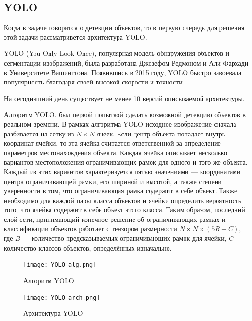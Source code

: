 \documentclass[../document.tex]{subfiles}
\begin{document}
    \subsection{YOLO}
	    \par Когда в задаче говорится о детекции объектов, то в первую очередь для решения этой задачи рассматривется архитектура YOLO.
	    \par YOLO (You Only Look Once), популярная модель обнаружения объектов и сегментации изображений, была разработана Джозефом Редмоном и Али Фархади в Университете Вашингтона. Появившись в 2015 году, YOLO быстро завоевала популярность благодаря своей высокой скорости и точности.
	    \par На сегодняшний день существует не менее 10 версий описываемой архитектуры.
	    \par Алгоритм YOLO, был первой попыткой сделать возможной детекцию объектов в реальном времени. В рамках алгоритма YOLO исходное изображение сначала разбивается на сетку из $N×N$ ячеек. Если центр объекта попадает внутрь координат ячейки, то эта ячейка считается ответственной за определение параметров местонахождения объекта. Каждая ячейка описывает несколько вариантов местоположения ограничивающих рамок для одного и того же объекта. Каждый из этих вариантов характеризуется пятью значениями — координатами центра ограничивающей рамки, его шириной и высотой, а также степени уверенности в том, что ограничивающая рамка содержит в себе объект. Также необходимо для каждой пары класса объектов и ячейки определить вероятность того, что ячейка содержит в себе объект этого класса. Таким образом, последний слой сети, принимающий конечное решение об ограничивающих рамках и классификации объектов работает с тензором размерности $N×N×(5B+C)$, где $B$ — количество предсказываемых ограничивающих рамок для ячейки, $C$ — количество классов объектов, определённых изначально.
	    
	    \begin{figure}[H]
	    	\centering
	    	\texttt{[image: YOLO\_alg.png]}
	    	\caption{Алгоритм YOLO}
	    \end{figure}
	    \begin{figure}[H]
	    	\centering
	    	\texttt{[image: YOLO\_arch.png]}
	    	\caption{Архитектура YOLO}
		\end{figure}
	
\end{document}
